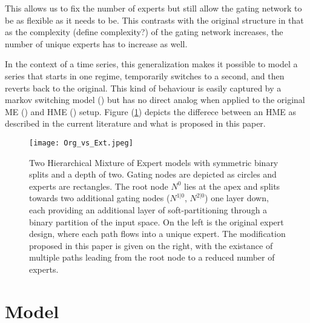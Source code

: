 \documentclass[12pt]{article}
\begin{document}
This allows us to fix the number of experts but still allow the gating network
to be as flexible as it needs to be. This contrasts with the original structure
in that as the complexity (define complexity?) of the gating network increases,
the number of unique experts has to increase as well.

In the context of a time series, this generalization makes it possible to
model a series that starts in one regime, temporarily switches to a second,
and then reverts back to the original. This kind of behaviour is easily captured
by a markov switching model (\cite{Hamilton1989}) but has no direct analog
when applied to the original ME (\cite{WMS1995}) and HME
(\cite{HuertaJiangTanner2003}) setup. Figure
(\ref{fig:HMEcomparison}) depicts the differece between an HME as described
in the current literature and what is proposed in this paper.

\begin{figure}[ht]
  \centering
  \texttt{[image: Org\_vs\_Ext.jpeg]}
  \caption{Two Hierarchical Mixture of Expert models with symmetric
  binary splits and a depth of two. Gating nodes are depicted as circles
  and experts are rectangles. The root node $N^{0}$ lies at the apex and
  splits towards two additional gating nodes ($N^{1|0}$, $N^{2|0}$) one layer
  down, each providing an  additional layer of soft-partitioning through a
  binary partition of the input space. On the left is the original expert
  design, where each path flows into a unique expert. The modification
  proposed in this paper is given on the right, with the existance of multiple
  paths leading from the root node to a reduced number of experts.}
  \label{fig:HMEcomparison}
\end{figure}


\section{Model}
\end{document}

